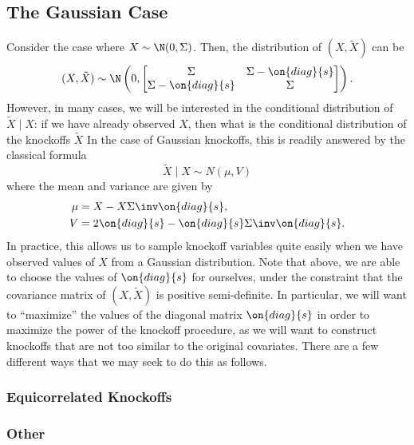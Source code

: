 \subsection{The Gaussian Case}
Consider the case where $X \sim \N(0, \Sigma)$. Then, the distribution of $(X, \tilde{X})$ can be
\[ (X, \tilde{X}) \sim \N \left(0, \begin{bmatrix}
	\Sigma & \Sigma - \on{diag}\{s \} \\
	\Sigma - \on{diag}\{s \} & \Sigma
\end{bmatrix} \right). \] However, in many cases, we will be interested in the conditional distribution of $\tilde{X} \mid X$: if we have already observed $X$, then what is the conditional distribution of the knockoffs $\tilde{X}$ In the case of Gaussian knockoffs, this is readily answered by the classical formula
\[ \tilde{X} \mid X \sim N(\mu, V) \] where the mean and variance are given by
\begin{align*}
\mu &= X - X \Sigma\inv \on{diag}\{ s \}, \\
V &= 2 \on{diag}\{ s \} - \on{diag}\{ s \} \Sigma\inv \on{diag} \{ s \}.
\end{align*}
In practice, this allows us to sample knockoff variables quite easily when we have observed values of $X$ from a Gaussian distribution. Note that above, we are able to choose the values of $\on{diag}\{s\}$ for ourselves, under the constraint that the covariance matrix of $(X, \tilde{X})$ is positive semi-definite. In particular, we will want to ``maximize'' the values of the diagonal matrix $\on{diag}\{s\}$ in order to maximize the power of the knockoff procedure, as we will want to construct knockoffs that are not too similar to the original covariates. There are a few different ways that we may seek to do this as follows.

\subsubsection{Equicorrelated Knockoffs}

\subsubsection{Other}

